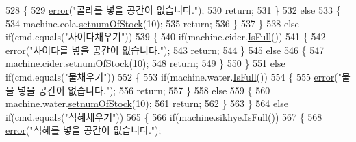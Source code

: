 \begin{DoxyCode}
528             \{
529                 \hyperlink{class_vending_machine_1_1_machine_u_i_a737e9b912652fdd8ed7824f12992d1bf}{error}(\textcolor{stringliteral}{"콜라를 넣을 공간이 없습니다."});
530                 \textcolor{keywordflow}{return};
531             \}
532             \textcolor{keywordflow}{else}
533             \{
534                 machine.cola.\hyperlink{class_vending_machine_1_1_product_a09bbd37ae2e203492a3ca553adf3a8fc}{setnumOfStock}(10);
535                 \textcolor{keywordflow}{return};
536             \}
537         \}
538         \textcolor{keywordflow}{else} \textcolor{keywordflow}{if}(cmd.equals(\textcolor{stringliteral}{"사이다채우기"}))
539         \{
540             \textcolor{keywordflow}{if}(machine.cider.\hyperlink{class_vending_machine_1_1_product_ac21e8cb627fddac1d392a765348c630e}{IsFull}())
541             \{
542                 \hyperlink{class_vending_machine_1_1_machine_u_i_a737e9b912652fdd8ed7824f12992d1bf}{error}(\textcolor{stringliteral}{"사이다를 넣을 공간이 없습니다."});
543                 \textcolor{keywordflow}{return};
544             \}
545             \textcolor{keywordflow}{else}
546             \{
547                 machine.cider.\hyperlink{class_vending_machine_1_1_product_a09bbd37ae2e203492a3ca553adf3a8fc}{setnumOfStock}(10);
548                 \textcolor{keywordflow}{return};
549             \}
550         \}
551         \textcolor{keywordflow}{else} \textcolor{keywordflow}{if}(cmd.equals(\textcolor{stringliteral}{"물채우기"}))
552         \{
553             \textcolor{keywordflow}{if}(machine.water.\hyperlink{class_vending_machine_1_1_product_ac21e8cb627fddac1d392a765348c630e}{IsFull}())
554             \{
555                 \hyperlink{class_vending_machine_1_1_machine_u_i_a737e9b912652fdd8ed7824f12992d1bf}{error}(\textcolor{stringliteral}{"물을 넣을 공간이 없습니다."});
556                 \textcolor{keywordflow}{return};
557             \}
558             \textcolor{keywordflow}{else}
559             \{
560                 machine.water.\hyperlink{class_vending_machine_1_1_product_a09bbd37ae2e203492a3ca553adf3a8fc}{setnumOfStock}(10);
561                 \textcolor{keywordflow}{return};
562             \}
563         \}
564         \textcolor{keywordflow}{else} \textcolor{keywordflow}{if}(cmd.equals(\textcolor{stringliteral}{"식혜채우기"}))
565         \{
566             \textcolor{keywordflow}{if}(machine.sikhye.\hyperlink{class_vending_machine_1_1_product_ac21e8cb627fddac1d392a765348c630e}{IsFull}())
567             \{
568                 \hyperlink{class_vending_machine_1_1_machine_u_i_a737e9b912652fdd8ed7824f12992d1bf}{error}(\textcolor{stringliteral}{"식혜를 넣을 공간이 없습니다."});

\end{DoxyCode}
